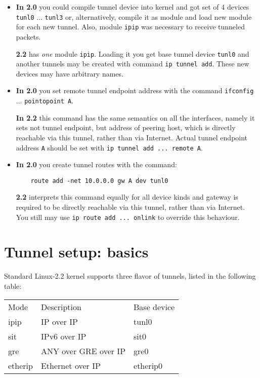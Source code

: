 \begin{itemize}

\item {\bf In 2.0} you could compile tunnel device into kernel
	and got set of 4 devices \verb|tunl0| ... \verb|tunl3| or,
	alternatively, compile it as module and load new module
	for each new tunnel. Also, module \verb|ipip| was necessary
	to receive tunneled packets.

      {\bf 2.2} has {\em one\/} module \verb|ipip|. Loading it you get base
	tunnel device \verb|tunl0| and another tunnels may be created with command
	\verb|ip tunnel add|. These new devices may have arbitrary names.


\item {\bf In 2.0} you set remote tunnel endpoint address with
	the command \verb|ifconfig| ... \verb|pointopoint A|.

	{\bf In 2.2} this command has the same semantics on all
	the interfaces, namely it sets not tunnel endpoint,
	but address of peering host, which is directly reachable
	via this tunnel,
	rather than via Internet. Actual tunnel endpoint address \verb|A|
	should be set with \verb|ip tunnel add ... remote A|.

\item {\bf In 2.0} you create tunnel routes with the command:
\begin{verbatim}
    route add -net 10.0.0.0 gw A dev tunl0
\end{verbatim}

	{\bf 2.2} interprets this command equally for all device
	kinds and gateway is required to be directly reachable via this tunnel,
	rather than via Internet. You still may use \verb|ip route add ... onlink|
	to override this behaviour.

\end{itemize}


\section{Tunnel setup: basics}

Standard Linux-2.2 kernel supports three flavor of tunnels,
listed in the following table:
\vspace{2mm}

\begin{tabular}{lll}
\vrule depth 0.8ex width 0pt\relax
Mode & Description  & Base device \\
ipip & IP over IP & tunl0 \\
sit & IPv6 over IP & sit0 \\
gre & ANY over GRE over IP & gre0 \\
etherip & Ethernet over IP & etherip0
\end{tabular}

